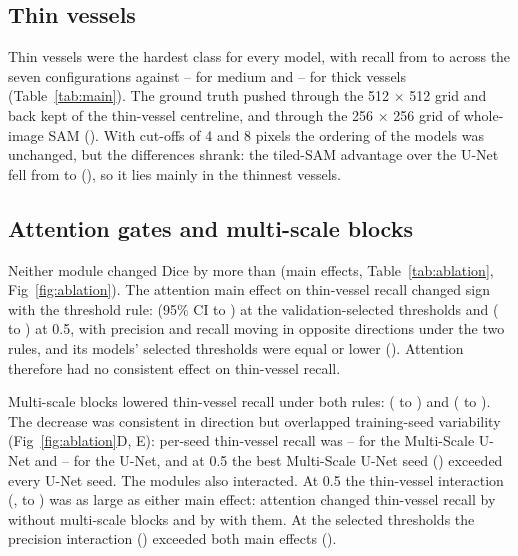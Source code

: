 



\subsection*{Thin vessels}
Thin vessels were the hardest class for every model, with recall from \AllThinMin{} to \AllThinMax{} across the seven
configurations against \AllMedMin--\AllMedMax{} for medium and \AllThickMinP--\AllThickMaxP{} for thick vessels
(Table~\ref{tab:main}). The ground truth pushed through the 512 $\times$ 512 grid and back kept \RefFiveThin{} of the
thin-vessel centreline, and through the 256 $\times$ 256 grid of whole-image SAM \RefTwoThin{} (). With
cut-offs of 4 and 8 pixels the ordering of the models was unchanged, but the differences shrank: the tiled-SAM advantage
over the U-Net fell from \SAMTiledThinDiff{} to \SAMTiledThinAltDiff{} (), so it lies mainly in the
thinnest vessels.

\subsection*{Attention gates and multi-scale blocks}
Neither module changed Dice by more than \AblDiceMainMaxAbs{} (main effects, Table~\ref{tab:ablation},
Fig~\ref{fig:ablation}). The attention main effect on thin-vessel recall changed sign with the threshold rule: \AblAttThinSel{}
(95\% CI \AblAttThinSelLo{} to \AblAttThinSelHi) at the validation-selected thresholds and \AblAttThinFix{}
(\AblAttThinFixLo{} to \AblAttThinFixHi) at 0.5, with precision and recall moving in opposite directions under the two
rules, and its models' selected thresholds were equal or lower (). Attention therefore had no
consistent effect on thin-vessel recall.

Multi-scale blocks lowered thin-vessel recall under both rules: \AblMSThinSel{} (\AblMSThinSelLo{} to \AblMSThinSelHi) and
\AblMSThinFix{} (\AblMSThinFixLo{} to \AblMSThinFixHi). The decrease was consistent in direction but overlapped
training-seed variability (Fig~\ref{fig:ablation}D, E): per-seed thin-vessel recall was \MSThinSeedMin--\MSThinSeedMax{} for
the Multi-Scale U-Net and \UNetThinSeedMin--\UNetThinSeedMax{} for the U-Net, and at 0.5 the best Multi-Scale U-Net seed
(\MSThinFixSeedMax) exceeded every U-Net seed. The modules also interacted. At 0.5 the thin-vessel interaction
(\AblIntThinFix, \AblIntThinFixLo{} to \AblIntThinFixHi) was as large as either main effect: attention changed thin-vessel
recall by \SimpleAttNoMSThinFix{} without multi-scale blocks and by \SimpleAttWithMSThinFix{} with them. At the selected
thresholds the precision interaction (\AblIntPrecSel) exceeded both main effects ().

